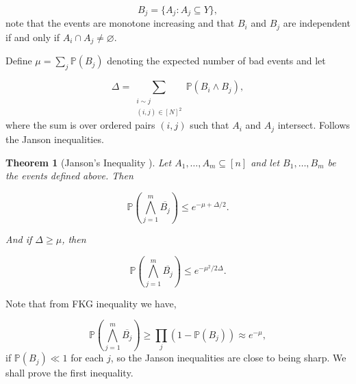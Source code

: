 \documentclass[12pt,twoside,a4paper,bibliography=totocnumbered]{book}
\numberwithin{equation}{section}
\let\emptyset=\varnothing
\newtheorem{theorem}             {Theorem}[section]
\theoremstyle{remark}
\begin{document}
$$ B_j = \{A_j \colon A_j \subseteq Y\},$$
note that the events are monotone increasing and that $B_i$ and $B_j$ are independent if and only if $A_i \cap A_j \neq \emptyset$. 

Define $\mu = \sum_j \mathbb{P}(B_j)$ denoting the expected number of bad events and let

$$ \Delta = \sum_{\substack{i\sim j\\ (i,j) \in [N]^2}} \mathbb{P}(B_i \wedge B_j), $$
where the sum is over ordered pairs $(i,j)$ such that $A_i$ and $A_j$ intersect. Follows the Janson inequalities.

\begin{theorem}[{Janson's Inequality \cite{Ja87}}]
Let $A_1,\ldots,A_m \subseteq [n]$ and let $B_1,\ldots,B_m$ be the events defined above. Then

$$ \mathbb{P}\left(\bigwedge_{j=1}^m \overline{B_j}\right) \leq e^{-\mu + \Delta/2}. $$

And if $\Delta \geq \mu$, then

$$ \mathbb{P}\left( \bigwedge_{j=1}^m \overline{B_j} \right) \leq e^{-\mu ^2 /2\Delta}.$$
\end{theorem}
Note that from FKG inequality we have,

$$ \mathbb{P}\left( \bigwedge_{j=1}^m \overline{B_j} \right) \geq \prod_j (1-\mathbb{P}(B_j)) \approx e^{-\mu}, $$
if $\mathbb{P}(B_j) \ll 1$ for each $j$, so the Janson inequalities are close to being sharp. We shall prove the first inequality.
\end{document}
